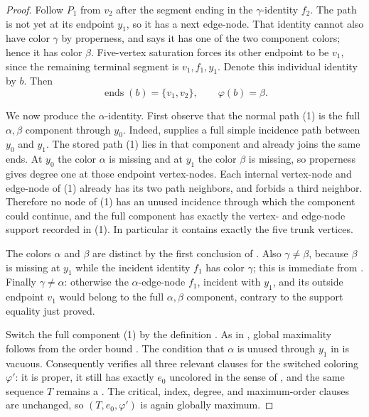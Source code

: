 \begin{proof}
Follow $P_1$ from $v_2$ after the segment ending in the $\gamma$-identity
$f_2$.  The path is not yet at its endpoint $y_1$, so it has a next
edge-node.  That identity cannot also have color $\gamma$ by properness,
and  says it has one of the two component
colors; hence it has color $\beta$.  Five-vertex saturation forces its
other endpoint to be $v_1$, since the remaining terminal segment is
$v_1,f_1,y_1$.  Denote this individual identity by $b$.  Then
\[
 \operatorname{ends}(b)=\{v_1,v_2\},
 \qquad \varphi(b)=\beta.                            \tag{4}
\]

We now produce the $\alpha$-identity.  First observe that the normal path
(1) is the full $\alpha,\beta$ component through $y_0$.  Indeed,
 supplies a full simple incidence path
between $y_0$ and $y_1$.  The stored path (1) lies in that component and
already joins the same ends.  At $y_0$ the color $\alpha$ is missing and
at $y_1$ the color $\beta$ is missing, so properness gives degree one at
those endpoint vertex-nodes.  Each internal vertex-node and edge-node of
(1) already has its two path neighbors, and
 forbids a third neighbor.
Therefore no node of (1) has an unused incidence through which the
component could continue, and the full component has exactly the vertex-
and edge-node support recorded in (1).  In particular it contains exactly
the five trunk vertices.

The colors $\alpha$ and $\beta$ are distinct by the first conclusion of
.  Also $\gamma\ne\beta$, because
$\beta$ is missing at $y_1$ while the incident identity $f_1$ has color
$\gamma$; this is immediate from .  Finally
$\gamma\ne\alpha$: otherwise the $\alpha$-edge-node $f_1$, incident with
$y_1$, and its outside endpoint $v_1$ would belong to the full
$\alpha,\beta$ component, contrary to the support equality just proved.

Switch the full component (1) by the definition
.  As in
, global maximality follows from
the order bound .  The condition that $\alpha$ is
unused through $y_1$ in  is vacuous.
Consequently  verifies all three relevant
clauses for the switched coloring $\varphi'$: it is proper, it still has
exactly $e_0$ uncolored in the sense of
, and the same sequence $T$ remains a
.  The critical, index, degree, and maximum-order
clauses are unchanged, so $(T,e_0,\varphi')$ is again globally maximum.


\end{proof}
